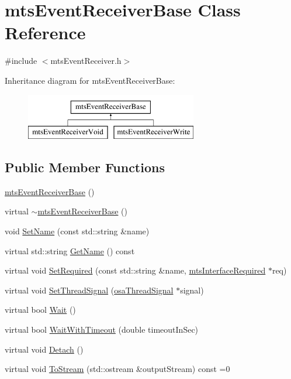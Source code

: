 \hypertarget{classmts_event_receiver_base}{\section{mts\-Event\-Receiver\-Base Class Reference}
\label{classmts_event_receiver_base}
}


{\ttfamily \#include $<$mts\-Event\-Receiver.\-h$>$}

Inheritance diagram for mts\-Event\-Receiver\-Base\-:\begin{figure}[H]
\begin{center}
\leavevmode
\includegraphics[height=2.000000cm]{dd/d13/classmts_event_receiver_base}
\end{center}
\end{figure}
\subsection*{Public Member Functions}
\begin{DoxyCompactItemize}
\item 
\hyperlink{classmts_event_receiver_base_ab314727db9aa9d80b01613de9a1a42d2}{mts\-Event\-Receiver\-Base} ()
\item 
virtual \hyperlink{classmts_event_receiver_base_ae60b84761a92809602795db3926b6c8e}{$\sim$mts\-Event\-Receiver\-Base} ()
\item 
void \hyperlink{classmts_event_receiver_base_a39498e4110e83c9b56a4906f1bac0995}{Set\-Name} (const std\-::string \&name)
\item 
virtual std\-::string \hyperlink{classmts_event_receiver_base_ae2e86b90ec87705a2555a6527db7750d}{Get\-Name} () const 
\item 
virtual void \hyperlink{classmts_event_receiver_base_a4665b40af0624b4b0a7c6d68b48b48d2}{Set\-Required} (const std\-::string \&name, \hyperlink{classmts_interface_required}{mts\-Interface\-Required} $\ast$req)
\item 
virtual void \hyperlink{classmts_event_receiver_base_a4f25888766923d3817be765ec69732ea}{Set\-Thread\-Signal} (\hyperlink{classosa_thread_signal}{osa\-Thread\-Signal} $\ast$signal)
\item 
virtual bool \hyperlink{classmts_event_receiver_base_aa866c97b0b386de71abf81fa5d11af4e}{Wait} ()
\item 
virtual bool \hyperlink{classmts_event_receiver_base_a07beefc75c0793e2c7b4255d10e4a3b9}{Wait\-With\-Timeout} (double timeout\-In\-Sec)
\item 
virtual void \hyperlink{classmts_event_receiver_base_ad8144eb2b093d1675755080af1e117ef}{Detach} ()
\item 
virtual void \hyperlink{classmts_event_receiver_base_a6c967920dab912f8126448c28f7e6c44}{To\-Stream} (std\-::ostream \&output\-Stream) const =0
\end{DoxyCompactItemize}

